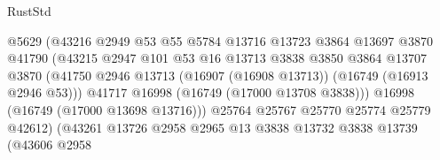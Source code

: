 \begin{lexlean}{RustStd}
\begin{coremodule}
                                          @5629
                                          (@43216
                                            @2949
                                            @53
                                            @55
                                            @5784
                                            @13716
                                            @13723
                                            @3864
                                            @13697
                                            @3870
                                            @41790
                                            (@43215
                                              @2947
                                              @101
                                              @53
                                              @16
                                              @13713
                                              @3838
                                              @3850
                                              @3864
                                              @13707
                                              @3870
                                              (@41750
                                                @2946
                                                @13713
                                                (@16907 (@16908 @13713))
                                                (@16749 (@16913 @2946 @53)))
                                              @41717
                                              @16998
                                              (@16749 (@17000 @13708 @3838)))
                                            @16998
                                            (@16749 (@17000 @13698 @13716)))
                                          @25764
                                          @25767
                                          @25770
                                          @25774
                                          @25779
                                          @42612)
                                        (@43261
                                          @13726
                                          @2958
                                          @2965
                                          @13
                                          @3838
                                          @13732
                                          @3838
                                          @13739
                                          (@43606
                                            @2958

\end{coremodule}
\end{lexlean}
